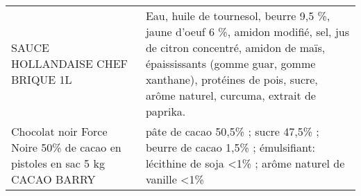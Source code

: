 \begin{longtable}{p{5cm}p{10cm}}
                                                                         SAUCE HOLLANDAISE CHEF BRIQUE 1L &                                                                                                                                                                                                                                                                                                                                                                                                                                                                                                                                                                                                                                                                                                                                                                                                 Eau, huile de tournesol, beurre 9,5 \%, jaune d'oeuf 6 \%, amidon modifié, sel, jus de citron concentré, amidon de maïs, épaississants (gomme guar, gomme xanthane), protéines de pois, sucre, arôme naturel, curcuma, extrait de paprika. \\
                               Chocolat noir Force Noire 50\% de cacao en pistoles en sac 5 kg CACAO BARRY &                                                                                                                                                                                                                                                                                                                                                                                                                                                                                                                                                                                                                                                                                                                                                                                                                                                                                                             pâte de cacao 50,5\% ; sucre 47,5\% ; beurre de cacao 1,5\% ; émulsifiant: lécithine de soja <1\% ; arôme naturel de vanille <1\% \\

\end{longtable}
